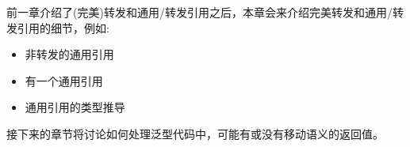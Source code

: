 前一章介绍了(完美)转发和通用/转发引用之后，本章会来介绍完美转发和通用/转发引用的细节，例如:\par

\begin{itemize}
	\item 非转发的通用引用
	\item 有一个通用引用
	\item 通用引用的类型推导
\end{itemize}

接下来的章节将讨论如何处理泛型代码中，可能有或没有移动语义的返回值。\par
















